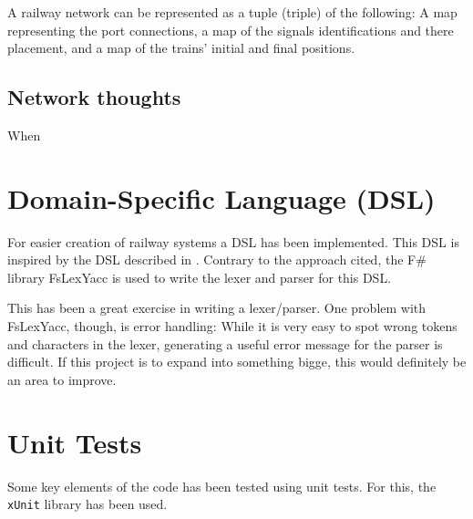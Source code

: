 A railway network can be represented as a tuple (triple) of the following: A map
representing the port connections, a map of the signals identifications and
there placement, and a map of the trains' initial and final positions. 


\subsection{Network thoughts} %

When 


\section{Domain-Specific Language (DSL)} %

For easier creation of railway systems a DSL has been implemented. This DSL is
inspired by the DSL described in \cite{kasting2016b}. Contrary to the approach
cited, the F\# library FsLexYacc is used to write the lexer and parser for this
DSL. 

This has been a great exercise in writing a lexer/parser. One problem with
FsLexYacc, though, is error handling: While it is very easy to spot wrong tokens
and characters in the lexer, generating a useful error message for the parser is
difficult. If this project is to expand into something bigge, this would
definitely be an area to improve. 


\section{Unit Tests} %

Some key elements of the code has been tested using unit tests. For this, the
\texttt{xUnit} library has been used.  

